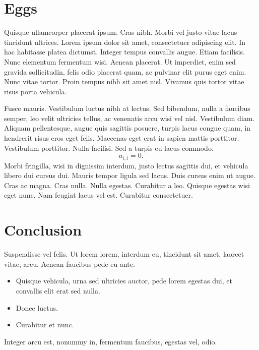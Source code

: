 \documentclass[paper=a4paper]{tudelftposter}
\begin{document}
\section{Eggs}

Quisque ullamcorper placerat ipsum. Cras nibh.  Morbi vel justo vitae lacus
tincidunt ultrices. Lorem ipsum dolor sit amet, consectetuer adipiscing elit. In
hac habitasse platea dictumst. Integer tempus convallis augue. Etiam facilisis.
Nunc elementum fermentum wisi. Aenean placerat. Ut imperdiet, enim sed gravida
sollicitudin, felis odio placerat quam, ac pulvinar elit purus eget enim. Nunc
vitae tortor. Proin tempus nibh sit amet nisl.  Vivamus quis tortor vitae risus
porta vehicula.


Fusce mauris. Vestibulum luctus nibh at lectus.  Sed bibendum, nulla a faucibus
semper, leo velit ultricies tellus, ac venenatis arcu wisi vel nisl. Vestibulum
diam. Aliquam pellentesque, augue quis sagittis posuere, turpis lacus congue
quam, in hendrerit risus eros eget felis. Maecenas eget erat in sapien mattis
porttitor. Vestibulum porttitor. Nulla facilisi. Sed a turpis eu lacus commodo.
\begin{equation}
  u_{i,i} = 0.
\end{equation}
Morbi fringilla, wisi in dignissim interdum, justo lectus sagittis
dui, et vehicula libero dui cursus dui. Mauris tempor ligula sed lacus. Duis
cursus enim ut augue. Cras ac magna. Cras nulla. Nulla egestas. Curabitur a leo.
Quisque egestas wisi eget nunc. Nam feugiat lacus vel est. Curabitur
consectetuer.

\section{Conclusion}

Suspendisse vel felis. Ut lorem lorem, interdum eu, tincidunt sit amet, laoreet
vitae, arcu. Aenean faucibus pede eu ante.
\begin{itemize}
  \item Quisque vehicula, urna sed ultricies auctor, pede lorem egestas dui, et
  convallis elit erat sed nulla.
  \item Donec luctus.
  \item Curabitur et nunc.
\end{itemize}
Integer arcu est, nonummy in, fermentum faucibus, egestas vel, odio.
\end{document}
